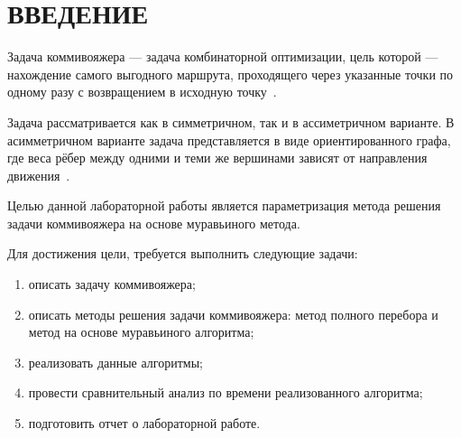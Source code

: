 \chapter*{\hfill{\centering ВВЕДЕНИЕ}\hfill}

Задача коммивояжера --- задача комбинаторной оптимизации, цель которой --- нахождение самого выгодного маршрута, проходящего через указанные точки по одному разу с возвращением в исходную точку~\cite{tsp-about}.

Задача рассматривается как в симметричном, так и в ассиметричном варианте. В асимметричном варианте задача представляется в виде ориентированного графа, где веса рёбер между одними и теми же вершинами зависят от направления движения~\cite{tsp-about}.

Целью данной лабораторной работы является параметризация метода решения задачи коммивояжера на основе муравьиного метода.

Для достижения цели, требуется выполнить следующие задачи:

\begin{enumerate}[label={\arabic*)}]
	\item описать задачу коммивояжера;
	\item описать методы решения задачи коммивояжера: метод полного перебора и метод на основе муравьиного алгоритма;
	\item реализовать данные алгоритмы;
	\item провести сравнительный анализ по времени реализованного алгоритма;
	\item подготовить отчет о лабораторной работе.
\end{enumerate}
